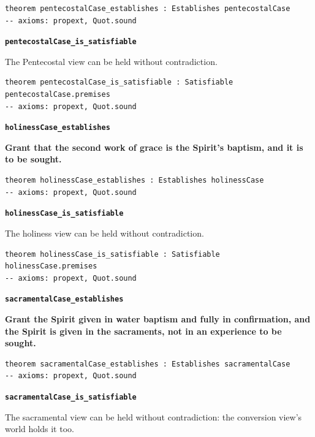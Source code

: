 \documentclass[11pt]{article}
\begin{document}
{\small\begin{verbatim}
theorem pentecostalCase_establishes : Establishes pentecostalCase
-- axioms: propext, Quot.sound
\end{verbatim}}
\par\medskip\noindent\textbf{\texttt{pentecostal\allowbreak{}Case\_\allowbreak{}is\_\allowbreak{}satisfiable}}\par\nobreak\noindent
The Pentecostal view can be held without contradiction.

{\small\begin{verbatim}
theorem pentecostalCase_is_satisfiable : Satisfiable pentecostalCase.premises
-- axioms: propext, Quot.sound
\end{verbatim}}
\par\medskip\noindent\textbf{\texttt{holiness\allowbreak{}Case\_\allowbreak{}establishes}}\par\nobreak\noindent
\textbf{Grant that the second work of grace is the Spirit’s baptism, and it is to be sought.}

{\small\begin{verbatim}
theorem holinessCase_establishes : Establishes holinessCase
-- axioms: propext, Quot.sound
\end{verbatim}}
\par\medskip\noindent\textbf{\texttt{holiness\allowbreak{}Case\_\allowbreak{}is\_\allowbreak{}satisfiable}}\par\nobreak\noindent
The holiness view can be held without contradiction.

{\small\begin{verbatim}
theorem holinessCase_is_satisfiable : Satisfiable holinessCase.premises
-- axioms: propext, Quot.sound
\end{verbatim}}
\par\medskip\noindent\textbf{\texttt{sacramental\allowbreak{}Case\_\allowbreak{}establishes}}\par\nobreak\noindent
\textbf{Grant the Spirit given in water baptism and fully in confirmation, and the Spirit is given in the sacraments, not in an experience to be sought.}

{\small\begin{verbatim}
theorem sacramentalCase_establishes : Establishes sacramentalCase
-- axioms: propext, Quot.sound
\end{verbatim}}
\par\medskip\noindent\textbf{\texttt{sacramental\allowbreak{}Case\_\allowbreak{}is\_\allowbreak{}satisfiable}}\par\nobreak\noindent
The sacramental view can be held without contradiction: the conversion view’s world holds it too.
\end{document}
